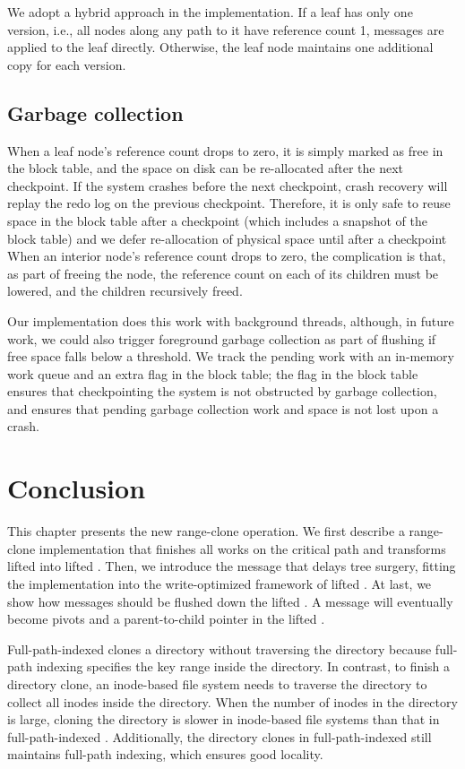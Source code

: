 We adopt a hybrid approach in the implementation.
If a leaf has only one version, i.e., all nodes along any path to it have
reference count 1, messages are applied to the leaf directly.
Otherwise, the leaf node maintains one additional copy for each version.

\subsection{Garbage collection}

When a leaf node's reference count drops to zero,
it is simply marked as free in the block table,
and the space on disk can be re-allocated after the next checkpoint.
If the system crashes before the next checkpoint, crash recovery will replay the
redo log on the previous checkpoint.
Therefore, it is only safe to reuse space in the block table
after a checkpoint (which includes a snapshot of the block table)
and we defer re-allocation of physical space until after a checkpoint
When an interior node's reference count drops to zero, the complication
is that, as part of freeing the node, the reference count on each of its children
must be lowered, and the children recursively freed.

Our \bedag implementation does this work with background threads,
although, in future work, we could also trigger foreground garbage collection
as part of flushing if free space falls below a threshold.
We track the pending work with an in-memory work queue and an extra flag in the block table;
the flag in the block table ensures that checkpointing the system is not obstructed by garbage collection,
and ensures that pending garbage collection work and space is not lost upon a crash.

\section{Conclusion}

This chapter presents the new range-clone operation.
We first describe a range-clone implementation that finishes all works
on the critical path and transforms lifted \bets into lifted \bedags.
Then, we introduce the \goto message that delays tree surgery,
fitting the implementation into the write-optimized framework of lifted \bedags.
At last, we show how \goto messages should be flushed down the lifted \bedags.
A \goto message will eventually become pivots and a parent-to-child pointer
in the lifted \bedag.

Full-path-indexed \betrfs clones a directory without traversing the directory
because full-path indexing specifies the key range inside the directory.
In contrast, to finish a directory clone,
an inode-based file system needs to traverse the directory to collect all inodes
inside the directory.
When the number of inodes in the directory is large,
cloning the directory is slower in inode-based file systems
than that in full-path-indexed \betrfs.
Additionally, the directory clones in full-path-indexed \betrfs
still maintains full-path indexing, which ensures good locality.

